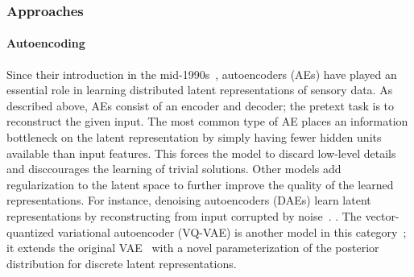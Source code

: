 \subsubsection{Approaches}

\paragraph{Autoencoding} 
Since their introduction in the mid-1990s~\cite{hinton_autoencoders_1994}, autoencoders (AEs)
have played an essential role in learning distributed latent representations of
sensory data. 
As described above, AEs consist of an encoder and decoder; the pretext task
is to reconstruct the given input. The most common type of AE places an
information bottleneck on the latent representation by simply having fewer
hidden units available than input features. This forces the model to discard
low-level details and disccourages the learning of trivial solutions. Other models add
regularization to the latent space to further improve the quality of the
learned representations.
For instance, denoising autoencoders (DAEs) learn latent representations by
reconstructing from input corrupted by noise~\cite{vincent_stacked_2010}. 
.
The vector-quantized variational autoencoder (VQ-VAE) is another model in this
category~\cite{oord_neural_2018};
it extends the original VAE~\cite{kingma_autoencoding_2014} with a novel
parameterization of the posterior distribution for discrete latent
representations. 



